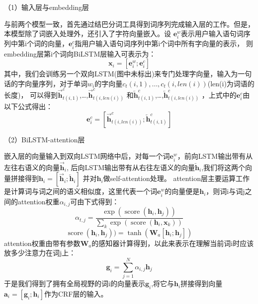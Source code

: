 （1）输入层与embedding层

与前两个模型一致，首先通过结巴分词工具得到词序列完成输入层的工作。但是，本模型除了词嵌入处理外，还引入了字符向量嵌入。设
$\mathbf{e}_{i}^{w}$表示用户输入语句词序列中第i个词的向量，$\mathbf{e}_{i}^{c}$指用户输入语句词序列中第i个词中所有字向量的表示，
则embedding层第i个词向BiLSTM层输入可表示为：
\begin{equation}
  \mathbf{x}_{i}=[\mathbf{e}_{i}^{w} ;\mathbf{e}_{i}^{c}]
\end{equation}
其中，我们会训练另一个双向LSTM(图中未标出)来专门处理字向量，输入为一句话的字向量序列，对于单词$w_i$的字向量$c_t(i,1),\dots,c_t(i,len(i))$(len(i)为词语的长度)，
可以得到$\overrightarrow{\mathbf{h}}_{t(i, 1)}^{c}$,\dots,$\overrightarrow{\mathbf{h}}_{t(i, len(i))}^{c}$
和$\overleftarrow{\mathbf{h}}_{t(i, 1)}^{c}$,\dots,$\overleftarrow{\mathbf{h}}_{t(i, len(i))}^{c}$ ，上式中的$\mathbf{e}_{i}^{c}$由以下公式得出：
\begin{equation}
  \mathbf{e}_{i}^{c}=[\overrightarrow{\mathbf{h}}_{t(i, len(i))}^{c} ; \overleftarrow{\mathbf{h}}_{t(i, 1)}^{c}]
\end{equation}

（2）BiLSTM-attention层

嵌入层的向量输入到双向LSTM网络中后，对每一个词$\mathbf{e}_{i}^{w}$，前向LSTM输出带有从左往右语义的向量$\overrightarrow{\mathbf{h}}_{i}$,
后向LSTM输出带有从右往左语义的向量$\overleftarrow{\mathbf{h}}_{i}$,我们将这两个向量拼接得到$\mathbf{h}_{i}=[\overrightarrow{\mathbf{h}}_{i} ;\overleftarrow{\mathbf{h}}_{i}]$
并对$\mathbf{h}_{i}$做self-attention处理。
attention层主要运算工作是计算词与词之间的语义相似度，这里代表一个词$\mathbf{e}_{i}^{w}$的向量便是$\mathbf{h}_{i}$，则词i与词j之间的attention权重$α_{i,j}$可由下式得到：
\begin{equation}
\alpha_{t, j}=\frac{\exp \left(\operatorname{score}\left(\mathbf{h}_{i}, \mathbf{h}_{j}\right)\right)}{\sum_{k} \exp \left(\operatorname{score}\left(\mathbf{h}_{i}, \mathbf{x}_{k}\right)\right)}
\end{equation}
\begin{equation}
  \operatorname{score}(\mathbf{h}_{i}, \mathbf{h}_{j}))=\tanh \left(\mathbf{W}_{a}\left[\mathbf{h}_{i} ; \mathbf{h}_{j}\right]\right)
\end{equation}
attention权重由带有参数$\mathbf{W}_{a}$的感知器计算得到，以此来表示在理解当前词i时应该放多少注意力在词j上：
\begin{equation}
  \mathbf{g}_{i}=\sum_{j=1}^{N} \alpha_{i, j} \mathbf{h}_{j}
\end{equation}
于是我们得到了拥有全局视野的词i的向量表示$\mathbf{g}_{i}$,将它与$\mathbf{h}_{i}$拼接得到向量$\mathbf{a}_{i}=[\mathbf{g}_{i} ;\mathbf{h}_{i}]$作为CRF层的输入。

